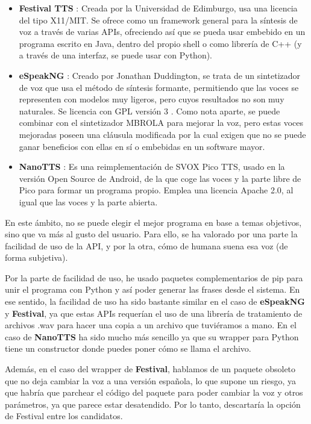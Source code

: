 \begin{itemize}
	\item \textbf{Festival TTS} \cite{festival}: Creada por la Universidad de Edimburgo, usa una licencia del tipo X11/MIT. Se ofrece como un framework general para la síntesis de voz a través de varias APIs, ofreciendo así que se pueda usar embebido en un programa escrito en Java, dentro del propio shell o como librería de C++ (y a través de una interfaz, se puede usar con Python).
	\item \textbf{eSpeakNG} \cite{espeak} \cite{espeak-ng}: Creado por Jonathan Duddington, se trata de un sintetizador de voz que usa el método de síntesis formante, permitiendo que las voces se representen con modelos muy ligeros, pero cuyos resultados no son muy naturales. Se licencia con GPL versión 3 \cite{gplv3}.
	Como nota aparte, se puede combinar con el sintetizador MBROLA para mejorar la voz, pero estas voces mejoradas poseen una cláusula modificada por la cual exigen que no se puede ganar beneficios con ellas en sí o embebidas en un software mayor.
	 \item \textbf{NanoTTS} \cite{nanotts}: Es una reimplementación de SVOX Pico TTS, usado en la versión Open Source de Android, de la que coge las voces y la parte libre de Pico para formar un programa propio. Emplea una licencia Apache 2.0, al igual que las voces y la parte abierta.
\end{itemize}

En este ámbito, no se puede elegir el mejor programa en base a temas objetivos, sino que va más al gusto del usuario. Para ello, se ha valorado por una parte la facilidad de uso de la API, y por la otra, cómo de humana suena esa voz (de forma subjetiva).

Por la parte de facilidad de uso, he usado paquetes complementarios de pip para unir el programa con Python y así poder generar las frases desde el sistema. En ese sentido, la facilidad de uso ha sido bastante similar en el caso de \textbf{eSpeakNG} y \textbf{Festival}, ya que estas APIs requerían el uso de una librería de tratamiento de archivos .wav para hacer una copia a un archivo que tuviéramos a mano. En el caso de \textbf{NanoTTS} ha sido mucho más sencillo ya que su wrapper para Python tiene un constructor donde puedes poner cómo se llama el archivo. 

Además, en el caso del wrapper de \textbf{Festival}, hablamos de un paquete obsoleto que no deja cambiar la voz a una versión española, lo que supone un riesgo, ya que habría que parchear el código del paquete para poder cambiar la voz y otros parámetros, ya que parece estar desatendido. Por lo tanto, descartaría la opción de Festival entre los candidatos.

